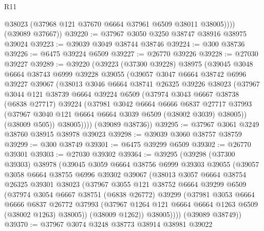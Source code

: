 \begin{lexlean}{R11}
\begin{coremodule}
            @38023
            (@37968 @121 @37670 @6664 @37961 @6509 @38011 @38005))))
      (@39089 @37667))
@39220 := @37967 @3050 @3250 @38747 @38916 @38975 @39024
@39223 := @39039 @3049 @38744 @38746
@39224 := @300 @38736
@39226 := @6475 @39224 @6509
@39227 := @26770 @39226
@39228 := @27030 @39227
@39289 := @39220
    (@39223
      (@37300 @39228)
      @38975
      (@39045
        @3048
        @6664
        @38743
        @6999
        @39228
        @39055
        (@39057
          @3047
          @6664
          @38742
          @6996
          @39227
          @39067
          (@38013
            @3046
            @6664
            @38741
            @26325
            @39226
            @38023
            (@37967
              @3044
              @121
              @38739
              @6664
              @39224
              @6509
              (@37974
                @3043
                @6667
                @38738
                (@6838 @27717)
                @39224
                (@37981
                  @3042
                  @6664
                  @6666
                  @6837
                  @27717
                  @37993
                  (@37967 @3040 @121 @6664 @6664 @3039 @6509 (@38002 @3039) @38005))
                (@38009 @505))
              @38005))))
      (@39089 @38736))
@39295 := @37967 @3061 @3249 @38760 @38915 @38978 @39023
@39298 := @39039 @3060 @38757 @38759
@39299 := @300 @38749
@39301 := @6475 @39299 @6509
@39302 := @26770 @39301
@39303 := @27030 @39302
@39364 := @39295
    (@39298
      (@37300 @39303)
      @38978
      (@39045
        @3059
        @6664
        @38756
        @6999
        @39303
        @39055
        (@39057
          @3058
          @6664
          @38755
          @6996
          @39302
          @39067
          (@38013
            @3057
            @6664
            @38754
            @26325
            @39301
            @38023
            (@37967
              @3055
              @121
              @38752
              @6664
              @39299
              @6509
              (@37974
                @3054
                @6667
                @38751
                (@6838 @26772)
                @39299
                (@37981
                  @3053
                  @6664
                  @6666
                  @6837
                  @26772
                  @37993
                  (@37967 @1264 @121 @6664 @6664 @1263 @6509 (@38002 @1263) @38005))
                (@38009 @1262))
              @38005))))
      (@39089 @38749))
@39370 := @37967 @3074 @3248 @38773 @38914 @38981 @39022

\end{coremodule}
\end{lexlean}
